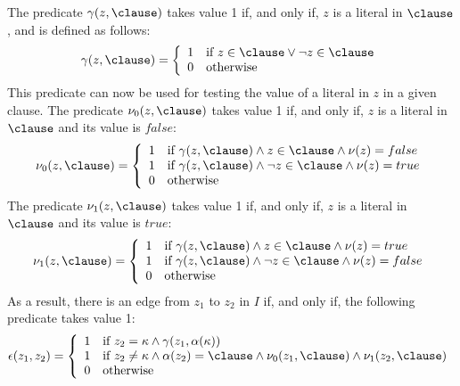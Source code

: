 \begin{definition}
    The predicate $\gamma(z, \clause)$ takes value 1 if, and only if, $z$
    is a literal in $\clause$, and is defined as follows:
    \begin{equation}
        \gamma(z, \clause) = 
        \left\{
            \begin{array}{ll}
                1 & \text{if $z \in \clause \lor \neg z \in \clause$} \\
                0 & \text{otherwise}
            \end{array}
        \right.
    \end{equation}
    This predicate can now be used for testing the value of a literal in $z$ in
    a given clause. The predicate $\nu_0(z, \clause)$ takes value 1 if, and only
    if, $z$ is a literal in $\clause$ and its value is $false$:
    \begin{equation}
        \nu_0(z, \clause) = 
        \left\{
            \begin{array}{ll}
                1 & \text{if $\gamma(z, \clause) \land z \in \clause \land \nu(z) = false$}\\
                1 & \text{if $\gamma(z, \clause) \land \neg z \in \clause \land \nu(z) = true$}\\
                0 & \text{otherwise}
            \end{array}
        \right.
    \end{equation}
    The predicate $\nu_1(z, \clause)$ takes value 1 if, and only if, $z$ is a
    literal in $\clause$ and its value is $true$:
    \begin{equation}
        \nu_1(z, \clause) = 
        \left\{
            \begin{array}{ll}
                1 & \text{if $\gamma(z, \clause) \land z \in \clause \land \nu(z) = true$}\\
                1 & \text{if $\gamma(z, \clause) \land \neg z \in \clause \land \nu(z) = false$}\\
                0 & \text{otherwise}
            \end{array}
        \right.
    \end{equation}
    As a result, there is an edge from $z_1$ to $z_2$ in $I$ if, and only if,
    the following predicate takes value 1:
    \begin{equation}
        \epsilon(z_1, z_2) = 
        \left\{
            \begin{array}{ll}
                1 & \text{if $z_2 = \kappa \land \gamma(z_1, \alpha(\kappa))$}\\
                1 & \text{if $z_2 \neq \kappa \land \alpha(z_2) = \clause \land \nu_0(z_1, \clause) \land \nu_1(z_2, \clause)$}\\
                0 & \text{otherwise}
            \end{array}
        \right.
    \end{equation}
\end{definition}

